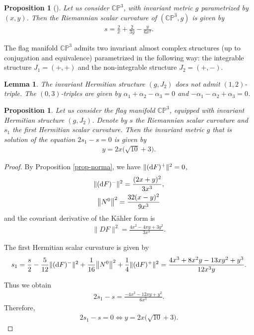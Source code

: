 \documentclass[10pt,a4paper]{amsart}
\numberwithin{equation}{section}
\newtheorem{Lemma}[Theorem]{Lemma}
\newtheorem{Proposition}[Theorem]{Proposition}
 { \theoremstyle{definition}
\newtheorem{Definition}[Theorem]{Definition}
\newtheorem{Question}[Theorem]{Question}
\newtheorem*{Notation}{Notation}
\newtheorem{Example}[Theorem]{Example}
\newtheorem{Remark}[Theorem]{Remark} }
\begin{document}
\begin{Proposition}[\cite{grego}]
Let us consider $\mathbb{CP}^3$, with invariant metric $g$ parametrized by $(x,y)$. Then the Riemannian scalar curvature of $(\mathbb{CP}^3,g)$ is given by
\begin{gather*}
s= \frac{2}{x}+\frac{2}{3y} - \frac{y}{6x^2}.
\end{gather*}
\end{Proposition}

The flag manifold $\mathbb{CP}^{3}$ admits two invariant almost complex structures (up to conjugation and equivalence) parametrized in the following way: the integrable structure $J_1=(+,+)$ and the non-integrable structure $J_2=(+,-)$.

\begin{Lemma}
The invariant Hermitian structure $(g, J_{2})$ does not admit $(1,2)$-triple. The $(0,3)$-triples are given by $\alpha_{1}+\alpha_{2}-\alpha_{3}=0$ and $-\alpha_{1}-\alpha_{2}+\alpha_{3}=0$.
\end{Lemma}

\begin{Proposition}\label{prop-cp3-j2}
Let us consider the flag manifold $\mathbb{CP}^3$, equipped with invariant Hermitian structure $(g, J_{2})$. Denote by $s$ the Riemannian scalar curvature and $s_1$ the first Hermitian scalar curvature. Then the invariant metric $g$ that is solution of the equation $2s_1-s=0$ is given by
 \begin{gather}
y=2x\big(\sqrt{10} +3\big).
\end{gather}
\end{Proposition}
\begin{proof}
By Proposition \ref{prop-norma}, we have $\|({\rm d}F)^{+}\|^{2}=0$,
\begin{gather*}
\|({\rm d}F)^{-}\|^{2}=\frac{(2 x+y)^2}{3 x^3},
\\
\big\|N^{0}\big\|^{2}=\frac{32 (x-y)^2}{9 x^3}
\end{gather*}
and the covariant derivative of the K\"ahler form is
\begin{gather*}
\|DF\|^2=\frac{4 x^2-4 x y+3 y^2}{3 x^3}.
\end{gather*}

The first Hermitian scalar curvature is given by
\begin{align*}
s_{1}=\dfrac{s}{2}-\dfrac{5}{12}\|({\rm d}F)^{-}\|^{2}+\dfrac{1}{16}\big\|N^{0}\big\|^{2}+\dfrac{1}{4}\|({\rm d}F)^{+}\|^{2}
=\frac{4 x^3+8 x^2 y-13 x y^2+y^3}{12 x^3 y}.
\end{align*}

Thus we obtain
\begin{gather*}
2s_{1}-s=\frac{-4 x^2-12 x y+y^2}{6 x^3}.
\end{gather*}
Therefore,
\begin{gather*}
2s_{1}-s=0\Leftrightarrow y=2x\big(\sqrt{10} +3\big).\tag*{\qed}
\end{gather*}
\renewcommand{\qed}{}
\end{proof}
\end{document}
